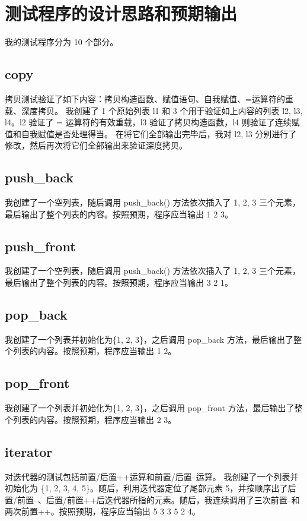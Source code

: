 \documentclass[UTF8]{ctexart}
\begin{document}
\pagestyle{fancy}
\fancyhead{}

\section{测试程序的设计思路和预期输出}

我的测试程序分为 10 个部分。

\subsection{copy}

拷贝测试验证了如下内容：拷贝构造函数、赋值语句、自我赋值、=运算符的重载、深度拷贝。
我创建了 1 个原始列表 l1 和 3 个用于验证如上内容的列表 l2, l3, l4。l2 验证了 = 运算符的有效重载，l3 验证了拷贝构造函数，l4 则验证了连续赋值和自我赋值是否处理得当。
在将它们全部输出完毕后，我对 l2, l3 分别进行了修改，然后再次将它们全部输出来验证深度拷贝。

\subsection{push\_back}
我创建了一个空列表，随后调用 push\_back() 方法依次插入了 1, 2, 3 三个元素，最后输出了整个列表的内容。按照预期，程序应当输出 1 2 3。
\subsection{push\_front}
我创建了一个空列表，随后调用 push\_back() 方法依次插入了 1, 2, 3 三个元素，最后输出了整个列表的内容。按照预期，程序应当输出 3 2 1。
\subsection{pop\_back}
我创建了一个列表并初始化为\{1, 2, 3\}，之后调用 pop\_back 方法，最后输出了整个列表的内容。按照预期，程序应当输出 1 2。
\subsection{pop\_front}
我创建了一个列表并初始化为\{1, 2, 3\}，之后调用 pop\_front 方法，最后输出了整个列表的内容。按照预期，程序应当输出 2 3。
\subsection{iterator}
对迭代器的测试包括前置/后置++运算和前置/后置--运算。
我创建了一个列表并初始化为 \{1, 2, 3, 4, 5\}。随后，利用迭代器定位了尾部元素 5，并按顺序出了后置/前置--、后置/前置++后迭代器所指的元素。随后，我连续调用了三次前置--和两次前置++。按照预期，程序应当输出 5 3 3 5 2 4。
\end{document}
